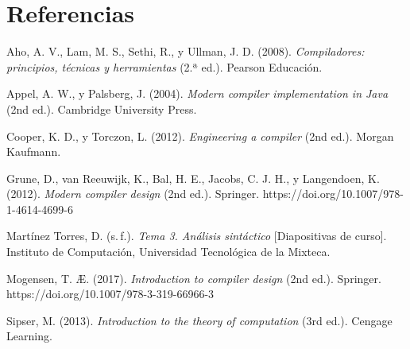 \section{Referencias}

\vspace{0.5cm}

\noindent
Aho, A. V., Lam, M. S., Sethi, R., y Ullman, J. D. (2008). \textit{Compiladores:
principios, técnicas y herramientas} (2.ª ed.). Pearson Educación.

\vspace{0.6cm}

\noindent
Appel, A. W., y Palsberg, J. (2004). \textit{Modern compiler implementation in Java}
(2nd ed.). Cambridge University Press.

\vspace{0.6cm}

\noindent
Cooper, K. D., y Torczon, L. (2012). \textit{Engineering a compiler} (2nd ed.).
Morgan Kaufmann.

\vspace{0.6cm}

\noindent
Grune, D., van Reeuwijk, K., Bal, H. E., Jacobs, C. J. H., y Langendoen, K. (2012).
\textit{Modern compiler design} (2nd ed.). Springer.
https://doi.org/10.1007/978-1-4614-4699-6

\vspace{0.6cm}

\noindent
Martínez Torres, D. (s.\,f.). \textit{Tema 3. Análisis sintáctico} [Diapositivas de
curso]. Instituto de Computación, Universidad Tecnológica de la Mixteca.

\vspace{0.6cm}

\noindent
Mogensen, T. Æ. (2017). \textit{Introduction to compiler design} (2nd ed.). Springer.
https://doi.org/10.1007/978-3-319-66966-3

\vspace{0.6cm}

\noindent
Sipser, M. (2013). \textit{Introduction to the theory of computation} (3rd ed.).
Cengage Learning.
